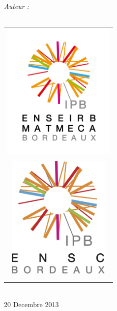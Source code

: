 \begin{titlepage}
\begin{flushleft} 
  \large
  \emph{Auteur :}\\
  \reportauthor\\
\end{flushleft}
\begin{center}
  
  \begin{center}
    \begin{tabular}{c}
      \\
      \includegraphics [width=55mm]{Images/ENSEIRB.png} \\
      \\
      \includegraphics [width=50mm]{Images/ENSC.jpg}\\
      \\
      \\
    \end{tabular}
    
    
      
    \textsc{\Large \reportsubject}\\[0.5cm]
           {\large 20 Decembre 2013}\\
           
           
           \HRule \\[0.4cm]
                  {\huge \bfseries \reporttitle}\\[0.4cm]
                  \HRule \\[1.5cm]
                  

\end{center}
\end{center}
\end{titlepage}
